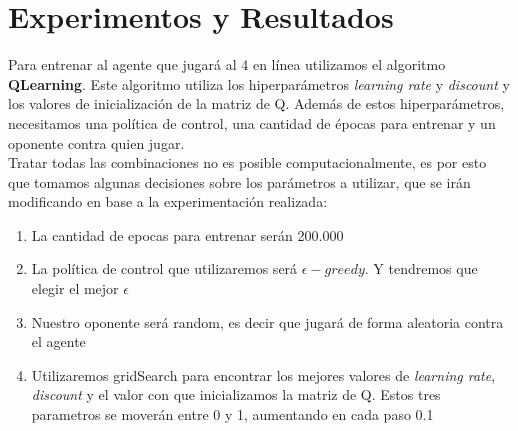 \section{Experimentos y Resultados}
%
%
%
%
%



Para entrenar al agente que jugará al 4 en línea utilizamos el algoritmo \textbf{QLearning}. Este algoritmo utiliza los hiperparámetros \textit{learning rate} y \textit{discount} y los valores de inicialización de la matriz de Q. Además de estos hiperparámetros, necesitamos una política de control, una cantidad de épocas para entrenar y un oponente contra quien jugar.  \\

Tratar todas las combinaciones no es posible computacionalmente, es por esto que tomamos algunas decisiones sobre los parámetros a utilizar, que se irán modificando en base a la experimentación realizada:

\begin{enumerate}
\item La cantidad de epocas para entrenar serán 200.000
\item La política de control que utilizaremos será \textbf{$\epsilon-greedy$}. Y tendremos que elegir el mejor $\epsilon$
\item Nuestro oponente será random, es decir que jugará de forma aleatoria contra el agente
\item Utilizaremos gridSearch para encontrar los mejores valores de \textit{learning rate},  \textit{discount} y el valor con que inicializamos la matriz de Q. Estos tres parametros se moverán entre 0 y 1, aumentando en cada paso 0.1
\end{enumerate}

